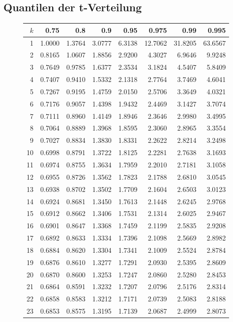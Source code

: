\subsection{Quantilen der t-Verteilung}
\begin{figure}[h!]
\scriptsize
\begin{center}
\begin{tabular}{|r|rrrrrrr|}
\hline
$k$&0.75&0.8&0.9&0.95&0.975&0.99&0.995\\
\hline
1&1.0000&1.3764&3.0777&6.3138&12.7062&31.8205&63.6567\\
2&0.8165&1.0607&1.8856&2.9200&4.3027&6.9646&9.9248\\
3&0.7649&0.9785&1.6377&2.3534&3.1824&4.5407&5.8409\\
4&0.7407&0.9410&1.5332&2.1318&2.7764&3.7469&4.6041\\
5&0.7267&0.9195&1.4759&2.0150&2.5706&3.3649&4.0321\\
6&0.7176&0.9057&1.4398&1.9432&2.4469&3.1427&3.7074\\
7&0.7111&0.8960&1.4149&1.8946&2.3646&2.9980&3.4995\\
8&0.7064&0.8889&1.3968&1.8595&2.3060&2.8965&3.3554\\
9&0.7027&0.8834&1.3830&1.8331&2.2622&2.8214&3.2498\\
10&0.6998&0.8791&1.3722&1.8125&2.2281&2.7638&3.1693\\
11&0.6974&0.8755&1.3634&1.7959&2.2010&2.7181&3.1058\\
12&0.6955&0.8726&1.3562&1.7823&2.1788&2.6810&3.0545\\
13&0.6938&0.8702&1.3502&1.7709&2.1604&2.6503&3.0123\\
14&0.6924&0.8681&1.3450&1.7613&2.1448&2.6245&2.9768\\
15&0.6912&0.8662&1.3406&1.7531&2.1314&2.6025&2.9467\\
16&0.6901&0.8647&1.3368&1.7459&2.1199&2.5835&2.9208\\
17&0.6892&0.8633&1.3334&1.7396&2.1098&2.5669&2.8982\\
18&0.6884&0.8620&1.3304&1.7341&2.1009&2.5524&2.8784\\
19&0.6876&0.8610&1.3277&1.7291&2.0930&2.5395&2.8609\\
20&0.6870&0.8600&1.3253&1.7247&2.0860&2.5280&2.8453\\
21&0.6864&0.8591&1.3232&1.7207&2.0796&2.5176&2.8314\\
22&0.6858&0.8583&1.3212&1.7171&2.0739&2.5083&2.8188\\
23&0.6853&0.8575&1.3195&1.7139&2.0687&2.4999&2.8073\\

\end{tabular}
\end{center}
\end{figure}
